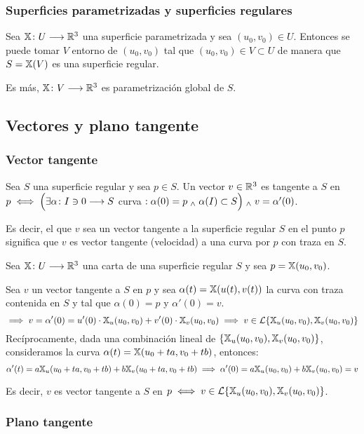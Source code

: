 \subsubsection{Superficies parametrizadas y superficies regulares}

Sea $\mathbb{X} \colon U \longrightarrow \mathbb{R}^3$ una superficie parametrizada y sea $(u_0, v_0) \in U$. Entonces se puede tomar $V$ entorno de $(u_0, v_0)$ tal que $(u_0, v_0) \in V \subset U$ de manera que $S=\mathbb{X}(V)$ es una superficie regular.

Es más, $\mathbb{X} \colon V \longrightarrow \mathbb{R}^3$ es parametrización global de $S$.

\subsection{Vectores y plano tangente}

\subsubsection{Vector tangente}

\begin{defn}
	Sea $S$ una superficie regular y sea $p \in S$. Un vector $v \in \mathbb{R}^3$ es tangente a $S$ en $p \iff \Big(\exists \alpha \colon I \ni 0 \longrightarrow S$ curva $: \alpha(0) = p \; _{\wedge} \; \alpha(I)\subset S \Big) \; _{\wedge} \; v = \alpha'(0)$.

	Es decir, el que $v$ sea un vector tangente a la superficie regular $S$ en el punto $p$ significa que $v$ es vector tangente (velocidad) a una curva por $p$ con traza en $S$.
\end{defn}

Sea $\mathbb{X} \colon U \longrightarrow \mathbb{R}^3$ una carta de una superficie regular $S$ y sea $p = \mathbb{X}(u_0, v_0)$.

Sea $v$ un vector tangente a $S$ en $p$ y sea $\alpha(t) = \mathbb{X}(u(t), v(t))$ la curva con traza contenida en $S$ y tal que $\alpha(0) = p$ y $\alpha'(0) = v$.
\[\implies v= \alpha'(0) = u'(0)\cdot\mathbb{X}_u(u_0, v_0) + v'(0)\cdot\mathbb{X}_v(u_0, v_0) \implies v \in \mathcal{L}\{\mathbb{X}_u(u_0, v_0), \mathbb{X}_v(u_0, v_0)\}\]
Recíprocamente, dada una combinación lineal de $\{\mathbb{X}_u(u_0, v_0), \mathbb{X}_v(u_0, v_0)\}$, consideramos la curva $\alpha(t) = \mathbb{X}(u_0 + ta, v_0 + tb)$, entonces:
\[\alpha'(t) = a\mathbb{X}_u(u_0 + ta, v_0 + tb) + b\mathbb{X}_v(u_0 + ta, v_0 + tb) \implies \alpha'(0) = a\mathbb{X}_u(u_0, v_0) + b\mathbb{X}_v(u_0, v_0) = v\]

Es decir, $v$ es vector tangente a $S$ en $p \iff v \in \mathcal{L}\{\mathbb{X}_u(u_0, v_0), \mathbb{X}_v(u_0, v_0)\}$.

\subsubsection{Plano tangente}

